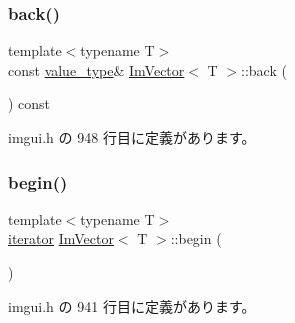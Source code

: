 \subsubsection{\texorpdfstring{back()}{back()}\hspace{0.1cm}{\footnotesize\ttfamily [2/2]}}
{\footnotesize\ttfamily template$<$typename T$>$ \\
const \mbox{\hyperlink{class_im_vector_a8bd77e4e7581d8e5f9e98d7c2f3c2a80}{value\+\_\+type}}\& \mbox{\hyperlink{class_im_vector}{Im\+Vector}}$<$ T $>$\+::back (\begin{DoxyParamCaption}{ }\end{DoxyParamCaption}) const\hspace{0.3cm}{\ttfamily [inline]}}



 imgui.\+h の 948 行目に定義があります。

\mbox{\label{class_im_vector_a300a8b559cd87a78063046ef81151bce}} 
\subsubsection{\texorpdfstring{begin()}{begin()}\hspace{0.1cm}{\footnotesize\ttfamily [1/2]}}
{\footnotesize\ttfamily template$<$typename T$>$ \\
\mbox{\hyperlink{class_im_vector_a74b5478f1f6fd471cc71219bce483db6}{iterator}} \mbox{\hyperlink{class_im_vector}{Im\+Vector}}$<$ T $>$\+::begin (\begin{DoxyParamCaption}{ }\end{DoxyParamCaption})\hspace{0.3cm}{\ttfamily [inline]}}



 imgui.\+h の 941 行目に定義があります。

